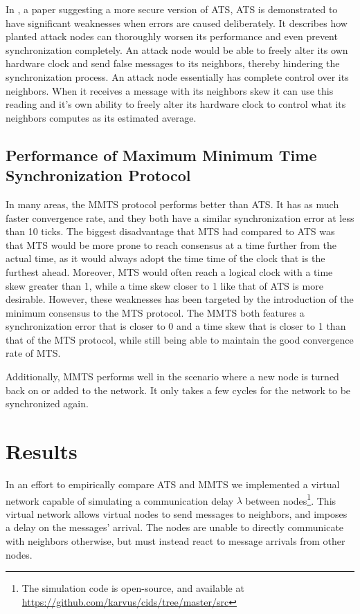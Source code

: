 \documentclass[a4paper,12pt]{article}
\begin{document}
In \citet{HeChengShiChen13}, a paper suggesting a more secure version of ATS, ATS is demonstrated to have significant weaknesses when errors are caused deliberately. It describes how planted attack nodes can thoroughly worsen its performance and even prevent synchronization completely. An attack node would be able to freely alter its own hardware clock and send false messages to its neighbors, thereby hindering the synchronization process. An attack node essentially has complete control over its neighbors. When it receives a message with its neighbors skew it can use this reading and it's own ability to freely alter its hardware clock to control what its neighbors computes as its estimated average.

\subsection{Performance of Maximum Minimum Time Synchronization Protocol}
In many areas, the MMTS protocol performs better than ATS. It has as much faster convergence rate, and they both have a similar synchronization error at less than 10 ticks. The biggest disadvantage that MTS had compared to ATS was that MTS would be more prone to reach consensus at a time further from the actual time, as it would always adopt the time time of the clock that is the furthest ahead. Moreover, MTS would often reach a logical clock with a time skew greater than 1, while a time skew closer to 1 like that of ATS is more desirable. However, these weaknesses has been targeted by the introduction of the minimum consensus to the MTS protocol. The MMTS both features a synchronization error that is closer to 0 and a time skew that is closer to 1 than that of the MTS protocol, while still being able to maintain the good convergence rate of MTS. \citep{HeChengShiChen13}

Additionally, MMTS performs well in the scenario where a new node is turned back on or added to the network. It only takes a few cycles for the network to be synchronized again. \citep{HeChengShiChen13}


\section{Results}

In an effort to empirically compare ATS and MMTS we implemented a virtual network capable of simulating a communication delay $\lambda$ between nodes\footnote{The simulation code is open-source, and available at \href{https://github.com/karvus/cids/tree/master/src}{https://github.com/karvus/cids/tree/master/src}}. This virtual network allows virtual nodes to send messages to neighbors, and imposes a delay on the messages' arrival. The nodes are unable to directly communicate with neighbors otherwise, but must instead react to message arrivals from other nodes.
\end{document}
